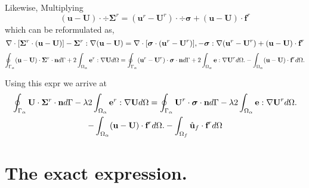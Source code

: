 \documentclass[12pt]{My_preprint}
\begin{document}
Likewise, Multiplying 
\begin{equation*}
    (\textbf{u} - \textbf{U})\cdot \div\bm\Sigma^r
    =
    (\textbf{u}^r - \textbf{U}^r) \cdot \div \bm\sigma
    + (\textbf{u} - \textbf{U}) \cdot \textbf{f}^r
\end{equation*}
which can be reformulated as, 
\begin{equation*}
    \mathbf{\nabla}\cdot [\bm\Sigma^r \cdot (\textbf{u} - \textbf{U})]
    - \bm\Sigma^r : \mathbf{\nabla} (\textbf{u} - \textbf{U})
    =
    \mathbf{\nabla}\cdot [\bm\sigma \cdot (\textbf{u}^r - \textbf{U}^r)], 
    - \bm\sigma : \mathbf{\nabla} (\textbf{u}^r - \textbf{U}^r)
    + (\textbf{u} - \textbf{U}) \cdot \textbf{f}^r
\end{equation*}
\begin{equation}
    \intS{(\textbf{u} - \textbf{U})\cdot \bm\Sigma^r \cdot \textbf{n}}
    + 2\intO{\textbf{e}^r : \grad \textbf{U}}
    =
    \intS{(\textbf{u}^r - \textbf{U}^r) \cdot  \bm\sigma\cdot \textbf{n} }
    + 2\intO{\textbf{e} : \grad \textbf{U}^r}. 
    - \intO{    (\textbf{u} - \textbf{U}) \cdot \textbf{f}^r}. 
    \label{eq:reciprocal_d}
\end{equation}

Using this expr we arrive at 
\begin{multline}
    \intS{\textbf{U}\cdot  \bm\Sigma^r \cdot \textbf{n}}
    - \lambda 2\intO{\textbf{e}^r : \grad \textbf{U}}
    = 
    \intS{\textbf{U}^r\cdot  \bm\sigma \cdot \textbf{n}}
    -\lambda  2\intO{ \textbf{e} : \grad \textbf{U}^r}. \\
    - \intO{    (\textbf{u} - \textbf{U}) \cdot \textbf{f}^r}. 
    - \intOf{\hat{\textbf{u}}_f\cdot  \textbf{f}^r}
    \label{eq:reciprocal_all}
\end{multline}

\section{The exact expression. }
\end{document}
